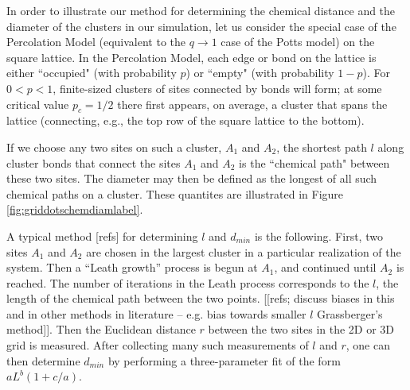\documentclass[pre,preprint]{revtex4}
\begin{document}
In order to illustrate our method for determining the chemical distance and the diameter of the clusters in our simulation, let us consider the special case of the Percolation Model (equivalent to the $q \to 1$ case of the Potts model) on the square lattice.  In the Percolation Model, each edge or bond on the lattice is either ``occupied" (with probability $p$) or ``empty" (with probability $1-p$). For $0 < p < 1$, finite-sized clusters of sites connected by bonds will form; at some critical value $p_c = 1/2$ there first appears, on average, a cluster that spans the lattice \cite{Stau96} (connecting, e.g., the top row of the square lattice to the bottom). 

If we choose any two sites on such a cluster, $A_1$ and $A_2$, the shortest path $l$ along cluster bonds that connect the sites $A_1$ and $A_2$ is the ``chemical path" \cite{HrHoSt84} between these two sites. The diameter may then be defined as the longest of all such chemical paths on a cluster. These quantites are illustrated in Figure \ref{fig:griddotschemdiamlabel}.



A typical method [refs] for determining $l$ and $d_{min}$ is the following.  First, two sites $A_1$ and $A_2$ are chosen in the largest cluster in a particular realization of the system.  Then a ``Leath growth'' process is begun at $A_1$, and continued until $A_2$ is reached.  The number of iterations in the Leath process corresponds to the $l$, the length of the chemical path between the two points.  [[refs; discuss biases in this and in other methods in literature -- e.g. bias towards smaller $l$ Grassberger's method]]. Then the Euclidean distance $r$ between the two sites in the 2D or 3D grid is measured.  After collecting many such measurements of $l$ and $r$, one can then determine $d_{min}$ by performing a three-parameter fit of the form $a L ^ b (1+ c/a)$.  

\end{document}
